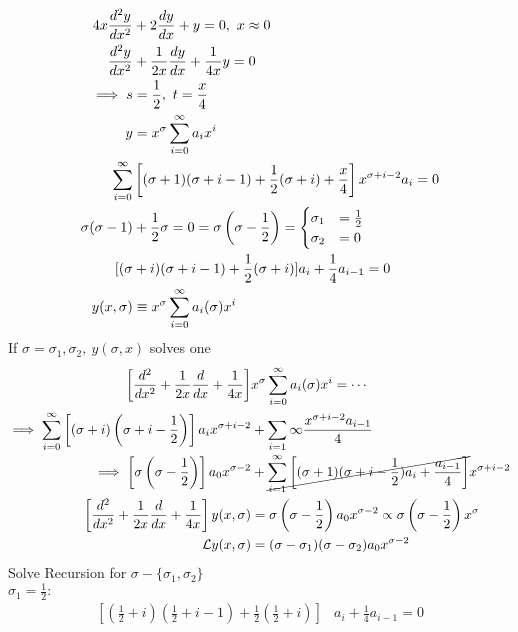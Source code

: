 \documentclass[Maths.tex]{subfiles}
\begin{document}
\begin{example}
\begin{align*}
    4x\frac{d^2 y}{dx^2} &+ 2\frac{dy}{dx} + y = 0,~ x \approx 0 \\
    \frac{d^2 y}{dx^2} &+ \frac{1}{2x}\frac{dy}{dx} + \frac{1}{4x}y = 0 \\
    \implies s &= \frac{1}{2},~ t = \frac{x}{4} \\
    y &= x^\sigma \sum_{i=0}^\infty a_ix^i \\
    \sum_{i=0}^\infty & \left[(\sigma+1)(\sigma+i-1) + \frac{1}{2}(\sigma+i) + \frac{x}{4}\right]x^{\sigma+i-2}a_i = 0 \\
    \sigma(\sigma-1)&+\frac{1}{2}\sigma = 0 = \sigma\left(\sigma-\frac{1}{2}\right) = \begin{cases} \sigma_1 & = \frac{1}{2} \\ \sigma_2 & = 0 \end{cases} \\
    [(\sigma &+ i)(\sigma+i-1) + \frac{1}{2}(\sigma+i)]a_i + \frac{1}{4}a_{i-1} = 0 \\
    y(x,\sigma) &\equiv x^\sigma \sum_{i=0}^\infty a_i(\sigma)x^i
\end{align*}
If $\sigma = \sigma_1, \sigma_2,~ y(\sigma,x)$ solves one
\begin{align*}
    \left[\frac{d^2}{dx^2}+\frac{1}{2x}\frac{d}{dx}+ \frac{1}{4x}\right]&x^\sigma \sum_{i=0}^\infty a_i(\sigma)x^i = \cdots \\
    \implies \sum_{i=0}^\infty  \left[(\sigma+i)\left(\sigma+i-\frac{1}{2}\right)\right]a_ix^{\sigma+i-2} &+ \sum_{i=1}\infty \frac{x^{\sigma+i-2}a_{i-1}}{4} \\
    \implies \left[\sigma\left(\sigma-\frac{1}{2}\right)\right] a_0x^{\sigma-2} &+ \cancel{\sum_{i=1}^\infty \left[(\sigma+1)(\sigma + i - \frac{1}{2})a_i + \frac{a_{i-1}}{4}\right]}x^{\sigma+i-2} \\
    \left[\frac{d^2}{dx^2} + \frac{1}{2x}\frac{d}{dx} + \frac{1}{4x}\right]y(x,\sigma) &= \sigma\left(\sigma - \frac{1}{2}\right)a_0 x^{\sigma-2} \propto \sigma\left(\sigma-\frac{1}{2}\right)x^{\sigma} \\
    \mathcal{L} y(x,\sigma) &= (\sigma - \sigma_1)(\sigma - \sigma_2)a_0 x^{\sigma - 2}
\end{align*}
Solve Recursion for $\sigma - \{\sigma_1,\sigma_2\}$ \\
$\sigma_1 = \frac{1}{2}:$
\begin{align*}
    \left[(\frac{1}{2}+i)(\frac{1}{2}+i-1) + \frac{1}{2}(\frac{1}{2}+i)\right]&a_i + \frac{1}{4} a_{i-1} = 0 \\

\end{align*}
\end{example}
\end{document}
